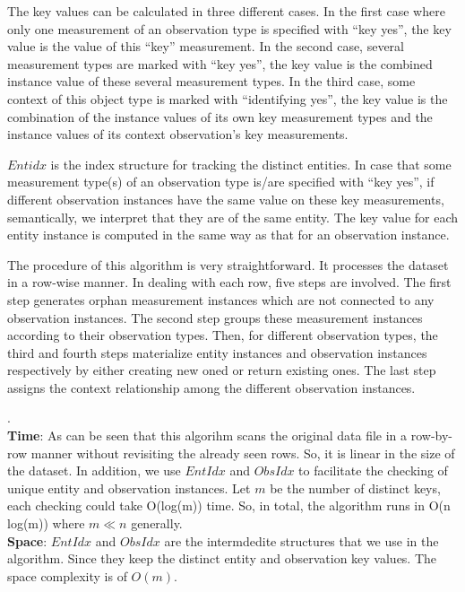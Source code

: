 \documentclass[10pt]{article}
\begin{document}
The key values can be calculated in three different cases.
In the first case where only one measurement of an observation type is specified with ``key yes'', the key value is the value of this ``key'' measurement.
 In the second case, several measurement types are marked with ``key yes'', the key value is the combined instance value of these several measurement types. 
In the third case, some context of this object type is marked with ``identifying yes'', the key value is the combination of the instance values of its own key measurement types and the instance values of its context observation's key measurements. 

$Entidx$ is the index structure for tracking the distinct entities. In case that some measurement type(s) of an observation type is/are specified with ``key yes'', 
if different observation instances have the same value on these key measurements, semantically, we interpret that they are of the same entity. 
The key value for each entity instance is computed in the same way as that for an observation instance.

The procedure of this algorithm is very straightforward. 
It processes the dataset in a row-wise manner. 
In dealing with each row, five steps are involved. 
The first step generates orphan measurement instances which are not connected to any observation instances.
The second step groups these measurement instances according to their observation types.
Then, for different observation types, the third and fourth steps materialize entity instances and observation instances respectively by either creating new oned or return existing ones. 
The last step assigns the context relationship among the different observation instances. 



. \\
{\bf Time}: As can be seen that  this algorihm scans the original data file in a row-by-row manner without revisiting the already seen rows. So, it is linear in the size of the dataset. 
In addition, we use $EntIdx$ and $ObsIdx$ to facilitate the checking of unique entity and observation instances. Let $m$ be the number of distinct keys, each checking could take O(log(m)) time. 
So, in total, the algorithm runs in O(n log(m)) where $m\ll n$ generally. \\
{\bf Space}: $EntIdx$ and $ObsIdx$ are the intermdedite structures that we use in the algorithm. Since they keep the distinct entity and observation key values. The space complexity is of $O(m)$. 
\end{document}
